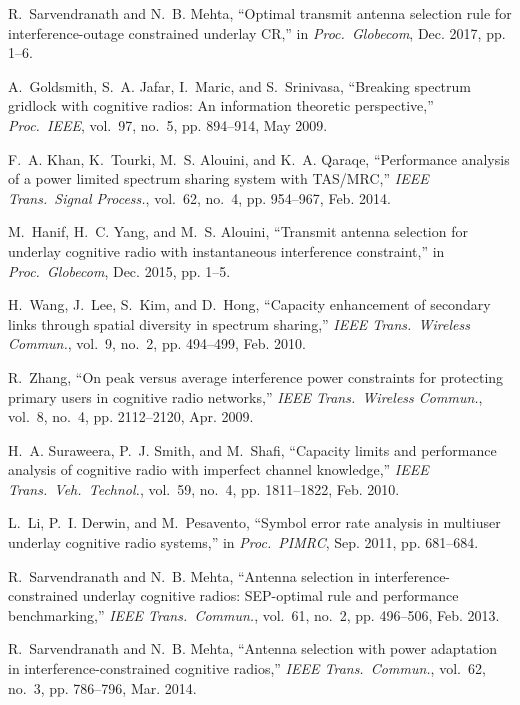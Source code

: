 \documentclass[journal]{IEEEtran}
\begin{document}
\begin{thebibliography}{10}
	R.~Sarvendranath and N.~B. Mehta, ``Optimal transmit antenna selection rule for
	interference-outage constrained underlay {CR},'' in \emph{Proc.\ Globecom},
	Dec. 2017, pp. 1--6.
	
	A.~Goldsmith, S.~A. Jafar, I.~Maric, and S.~Srinivasa, ``Breaking spectrum
	gridlock with cognitive radios: An information theoretic perspective,''
	\emph{Proc.\ IEEE}, vol.~97, no.~5, pp. 894--914, May 2009.
	
	F.~A. Khan, K.~Tourki, M.~S. Alouini, and K.~A. Qaraqe, ``Performance analysis
	of a power limited spectrum sharing system with {TAS/MRC},'' \emph{IEEE
		Trans.\ Signal Process.}, vol.~62, no.~4, pp. 954--967, Feb. 2014.
	
	M.~Hanif, H.~C. Yang, and M.~S. Alouini, ``Transmit antenna selection for
	underlay cognitive radio with instantaneous interference constraint,'' in
	\emph{Proc.\ Globecom}, Dec. 2015, pp. 1--5.
	
	H.~Wang, J.~Lee, S.~Kim, and D.~Hong, ``Capacity enhancement of secondary links
	through spatial diversity in spectrum sharing,'' \emph{IEEE Trans.\ Wireless
		Commun.}, vol.~9, no.~2, pp. 494--499, Feb. 2010.
	
	R.~Zhang, ``On peak versus average interference power constraints for
	protecting primary users in cognitive radio networks,'' \emph{IEEE Trans.\
		Wireless Commun.}, vol.~8, no.~4, pp. 2112--2120, Apr. 2009.
	
	H.~A. Suraweera, P.~J. Smith, and M.~Shafi, ``Capacity limits and performance
	analysis of cognitive radio with imperfect channel knowledge,'' \emph{IEEE
		Trans.\ Veh.\ Technol.}, vol.~59, no.~4, pp. 1811--1822, Feb. 2010.
	
	L.~Li, P.~I. Derwin, and M.~Pesavento, ``Symbol error rate analysis in
	multiuser underlay cognitive radio systems,'' in \emph{Proc.\ {PIMRC}}, Sep.
	2011, pp. 681--684.
	
	R.~Sarvendranath and N.~B. Mehta, ``Antenna selection in
	interference-constrained underlay cognitive radios: {SEP}-optimal rule and
	performance benchmarking,'' \emph{IEEE Trans.\ Commun.}, vol.~61, no.~2, pp.
	496--506, Feb. 2013.
	
	R.~Sarvendranath and N.~B. Mehta, ``Antenna selection with power adaptation in interference-constrained cognitive radios,'' \emph{IEEE Trans.\ Commun.}, vol.~62, no.~3, pp.
	786--796, Mar. 2014.
	

\end{thebibliography}
\end{document}

